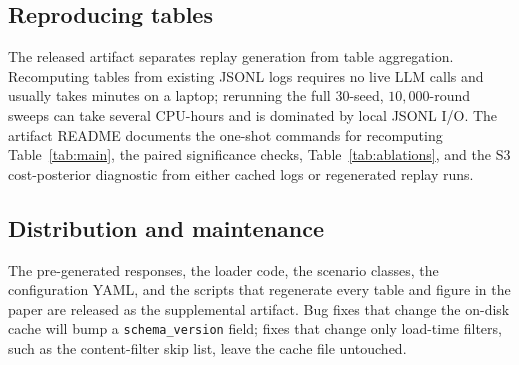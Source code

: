 \subsection{Reproducing tables}
\label{app:dataset-reproducing-tables}

The released artifact separates replay generation from table
aggregation. Recomputing tables from existing JSONL logs requires no live
LLM calls and usually takes minutes on a laptop; rerunning the full
$30$-seed, $10{,}000$-round sweeps can take several CPU-hours and is
dominated by local JSONL I/O.
The artifact README documents the one-shot commands for recomputing
Table~\ref{tab:main}, the paired significance checks, Table~\ref{tab:ablations},
and the S3 cost-posterior diagnostic from either cached logs or regenerated
replay runs.

\subsection{Distribution and maintenance}
\label{app:dataset-distribution}

The pre-generated responses, the loader code, the scenario classes, the
configuration YAML, and the scripts that regenerate every table and
figure in the paper are released as the supplemental artifact. Bug fixes
that change the on-disk cache will bump a \texttt{schema\_version} field;
fixes that change only load-time filters, such as the content-filter skip
list, leave the cache file untouched.
